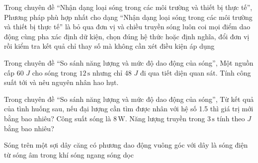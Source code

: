 \begin{ex}
Trong chuyên đề “Nhận dạng loại sóng trong các môi trường và thiết bị thực tế”, Phương pháp phù hợp nhất cho dạng “Nhận dạng loại sóng trong các môi trường và thiết bị thực tế” là
\choice
{bỏ qua đơn vị và chiều truyền sóng}
{luôn coi mọi điểm dao động cùng pha}
{\True xác định dữ kiện, chọn đúng hệ thức hoặc định nghĩa, đổi đơn vị rồi kiểm tra kết quả}
{chỉ thay số mà không cần xét điều kiện áp dụng}
\end{ex}

\begin{bt}
Trong chuyên đề “So sánh năng lượng và mức độ dao động của sóng”, Một nguồn cấp 60 $J$ cho sóng trong $12\,\text{s}$ nhưng chỉ 48 $J$ đi qua tiết diện quan sát. Tính công suất tới và nêu nguyên nhân hao hụt.
\end{bt}

\begin{ex}
Trong chuyên đề “So sánh năng lượng và mức độ dao động của sóng”, Từ kết quả của tình huống sau, nếu đại lượng cần tìm được nhân với hệ số 1.5 thì giá trị mới bằng bao nhiêu? Công suất sóng là $8\,\text{W}$. Năng lượng truyền trong $3\,\text{s}$ tính theo $J$ bằng bao nhiêu?
\end{ex}

\begin{ex}
Sóng trên một sợi dây căng có phương dao động vuông góc với dây là
\choice
{sóng điện từ}
{sóng âm trong khí}
{\True sóng ngang}
{sóng dọc}
\end{ex}

